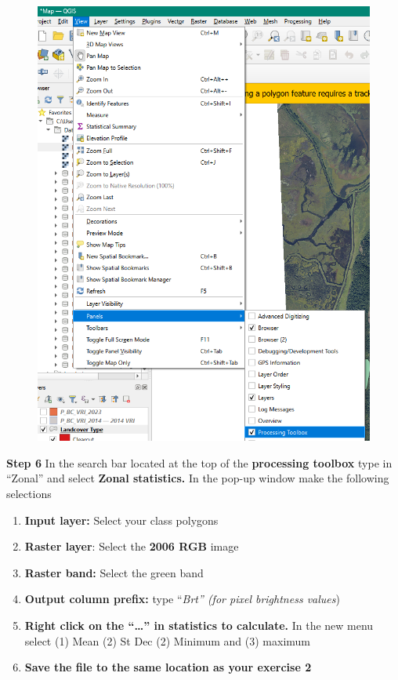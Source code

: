 \documentclass[
  letterpaper,
]{book}
\providecommand{\tightlist}{%
  \setlength{\itemsep}{0pt}\setlength{\parskip}{0pt}}\usepackage{longtable,booktabs,array}
\begin{document}
\begin{figure}

\includegraphics[width=4.89583in,height=\textheight]{images/clipboard-3381024759.png} \hfill{}

\end{figure}

\textbf{Step 6} In the search bar located at the top of the
\textbf{processing toolbox} type in ``Zonal'' and select \textbf{Zonal
statistics.} In the pop-up window make the following selections

\begin{enumerate}
\def\labelenumi{\Alph{enumi}.}
\tightlist
\item
  \textbf{Input layer:} Select your class polygons
\item
  \textbf{Raster layer}: Select the \textbf{2006 RGB} image
\item
  \textbf{Raster band:} Select the green band
\item
  \textbf{Output column prefix:} type ``\emph{Brt'' (for pixel
  brightness values})
\item
  \textbf{Right click on the ``\ldots{}'' in statistics to calculate.}
  In the new menu select (1) Mean (2) St Dec (2) Minimum and (3) maximum
\item
  \textbf{Save the file to the same location as your exercise 2}
\end{enumerate}
\end{document}
